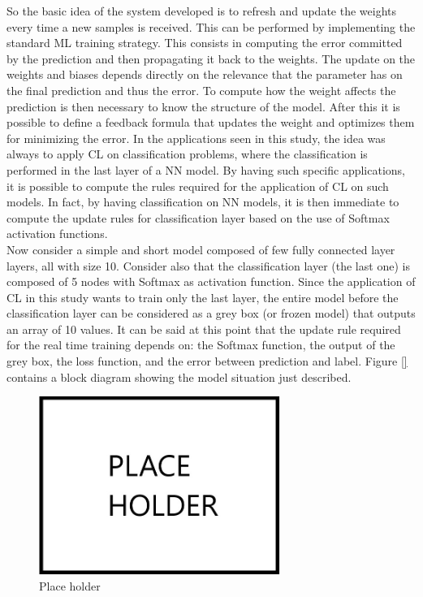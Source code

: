 \documentclass[12pt]{report}
\begin{document}
So the basic idea of the system developed is to refresh and update the weights every time a new samples is received. This can be performed by implementing the standard ML training strategy. This consists in computing the error committed by the prediction and then propagating it back to the weights. The update on the weights and biases depends directly on the relevance that the parameter has on the final prediction and thus the error. To compute how the weight affects the prediction is then necessary to know the structure of the model. After this it is possible to define a feedback formula that updates the weight and optimizes them for minimizing the error. In the applications seen in this study, the idea was always to apply CL on classification problems, where the classification is performed in the last layer of a NN model. By having such specific applications, it is possible to compute the rules required for the application of CL on such models. In fact, by having classification on NN models, it is then immediate to compute the update rules for classification layer based on the use of Softmax activation functions.\\
Now consider a simple and short model composed of few fully connected layer layers, all with size 10. Consider also that the classification layer (the last one) is composed of 5 nodes with Softmax as activation function. Since the application of CL in this study wants to train only the last layer, the entire model before the classification layer can be considered as a grey box (or frozen model) that outputs an array of 10 values. It can be said at this point that the update rule required for the real time training depends on: the Softmax function, the output of the grey box, the loss function, and the error between prediction and label. Figure \ref{} contains a block diagram showing the model situation just described. \\

\begin{figure}[h!]
    \centering
    \includegraphics[width=0.7\textwidth]{Figures/Chapter3/PLACEHOLDER.jpg} 
    \caption{Place holder}
    \label{fig:placeholder}    
\end{figure}
\end{document}
